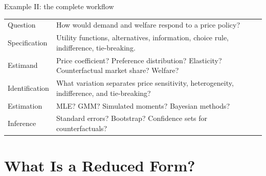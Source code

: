 \documentclass[aspectratio=169,11pt]{beamer}
\begin{document}
\begin{frame}{Example II: the complete workflow}

\small

\begin{tabular}{B{0.22\textwidth} L{0.68\textwidth}}
\toprule
Question
&
How would demand and welfare respond to a price policy?
\\[0.5em]

Specification
&
Utility functions, alternatives, information,
choice rule, indifference, tie-breaking.
\\[0.5em]

Estimand
&
Price coefficient?
Preference distribution?
Elasticity?
Counterfactual market share?
Welfare?
\\[0.5em]

Identification
&
What variation separates price sensitivity,
heterogeneity, indifference, and tie-breaking?
\\[0.5em]

Estimation
&
MLE?
GMM?
Simulated moments?
Bayesian methods?
\\[0.5em]

Inference
&
Standard errors?
Bootstrap?
Confidence sets for counterfactuals?
\\
\bottomrule
\end{tabular}

\vspace{0.35em}

\begin{center}
\end{center}

\end{frame}

\section{What Is a Reduced Form?}
\end{document}
